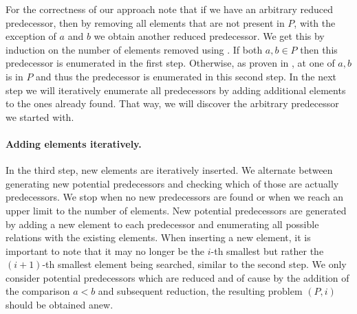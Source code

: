 \documentclass[twoside,leqno,twocolumn]{article}
\begin{document}
For the correctness of our approach note that if we have an arbitrary reduced predecessor, then by removing all elements that are not present in $P$, with the exception of $a$ and $b$ we obtain another reduced predecessor.
We get this by induction on the number of elements removed using .
If both $a, b \in P$ then this predecessor is enumerated in the first step.
Otherwise, as proven in , at one of $a, b$ is in $P$ and thus the predecessor is enumerated in this second step.
In the next step we will iteratively enumerate all predecessors by adding additional elements to the ones already found.
That way, we will discover the arbitrary predecessor we started with.

\paragraph{Adding elements iteratively.}
In the third step, new elements are iteratively inserted.
We alternate between generating new potential predecessors and checking which of those are actually predecessors.
We stop when no new predecessors are found or when we reach an upper limit to the number of elements.
New potential predecessors are generated by adding a new element to each predecessor and enumerating all possible relations with the existing elements.
When inserting a new element, it is important to note that it may no longer be the $i$-th smallest but rather the $(i + 1)$-th smallest element being searched, similar to the second step.
We only consider potential predecessors which are reduced and of cause by the addition of the comparison $a < b$ and subsequent reduction, the resulting problem $(P, i)$ should be obtained anew.
\end{document}
